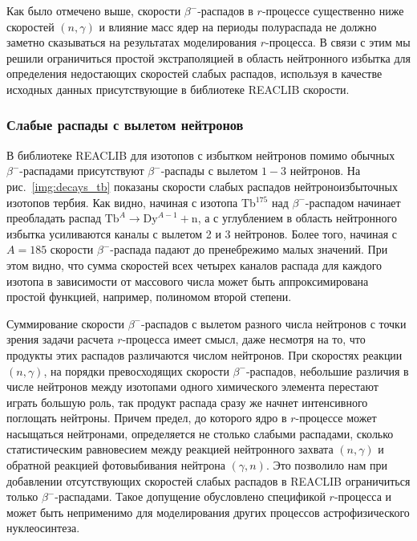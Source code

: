   Как было отмечено выше, скорости $\beta^-$-распадов в $r$-процессе существенно ниже скоростей $(n,\gamma)$ и влияние масс ядер на периоды полураспада не должно заметно сказываться на результатах моделирования $r$-процесса. В связи с этим мы решили ограничиться простой экстраполяцией в область нейтронного избытка для определения недостающих скоростей слабых распадов, используя в качестве исходных данных присутствующие в библиотеке REACLIB скорости. 

\subsubsection{Слабые распады с вылетом нейтронов}
  В библиотеке REACLIB для изотопов с избытком нейтронов помимо обычных $\beta^-$-распадами присутствуют $\beta^-$-распады с вылетом $1-3$ нейтронов. На рис.~\ref{img:decays_tb} показаны скорости слабых распадов нейтроноизбыточных изотопов тербия. Как видно, начиная с изотопа Tb$^{175}$ над $\beta^-$-распадом начинает преобладать распад $\text{Tb}^A \rightarrow \text{Dy}^{A-1} + \text{n}$, а с углублением в область нейтронного избытка усиливаются каналы с вылетом 2 и 3 нейтронов. Более того, начиная с $A = 185$ скорости $\beta^-$-распада падают до пренебрежимо малых значений. При этом видно, что сумма скоростей всех четырех каналов распада для каждого изотопа в зависимости от массового числа может быть аппроксимирована простой функцией, например, полиномом второй степени.

  Суммирование скорости $\beta^-$-распадов с вылетом разного числа нейтронов с точки зрения задачи расчета $r$-процесса имеет смысл, даже несмотря на то, что продукты этих распадов различаются числом нейтронов. При скоростях реакции $(n,\gamma)$, на порядки превосходящих скорости $\beta^-$-распадов, небольшие различия в числе нейтронов между изотопами одного химического элемента перестают играть большую роль, так продукт распада сразу же начнет интенсивного поглощать нейтроны. Причем предел, до которого ядро в $r$-процессе может насыщаться нейтронами, определяется не столько слабыми распадами, сколько статистическим равновесием между реакцией нейтронного захвата $(n,\gamma)$ и обратной реакцией фотовыбивания нейтрона $(\gamma,n)$. Это позволило нам при добавлении отсутствующих скоростей слабых распадов в REACLIB ограничиться только $\beta^-$-распадами. Такое допущение обусловлено спецификой $r$-процесса и может быть неприменимо для моделирования других процессов астрофизического нуклеосинтеза. 

